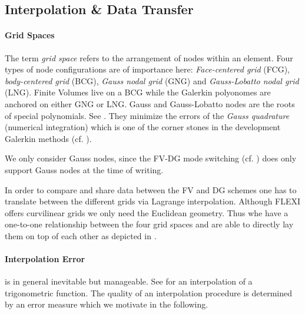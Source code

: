 \subsection{Interpolation \& Data Transfer}
\label{sec:trafo}

\paragraph{Grid Spaces}
The term \emph{grid space} refers to the arrangement of nodes within an
element. Four types of node configurations are of importance here:
\emph{Face-centered grid} (FCG), \emph{body-centered grid} (BCG), \emph{Gauss
nodal grid} (GNG) and \emph{Gauss-Lobatto nodal grid} (LNG). Finite Volumes
live on a BCG while the Galerkin polyonomes are anchored on either GNG or LNG.
Gauss and Gauss-Lobatto nodes are the roots of special polynomials.  See
. They minimize the errors of the \emph{Gauss quadrature}
(numerical integration) which is one of the corner stones in the development
Galerkin methods (cf. ).


We only consider Gauss nodes, since the FV-DG mode switching (cf.
) does only support Gauss nodes at the time of
writing.

In order to compare and share data between the FV and DG schemes one has to
translate between the different grids via Lagrange interpolation.  Although
FLEXI offers curvilinear grids we only need the Euclidean geometry. Thus whe
have a one-to-one relationship between the four grid spaces and are able to
directly lay them on top of each other as depicted in .

\paragraph{Interpolation Error} is in general inevitable but manageable.
See  for an interpolation of a trigonometric
function. The quality of an interpolation procedure is determined by an
error measure which we motivate in the following.

